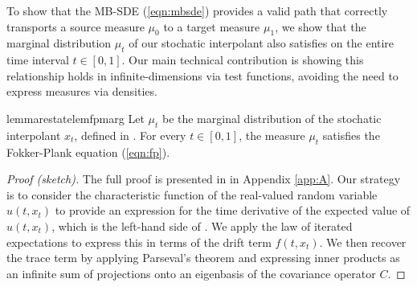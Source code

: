 To show that the MB-SDE (\ref{eqn:mbsde}) provides a valid path that correctly transports a source measure \(\mu_{0}\) to a target measure \(\mu_{1}\), we show that the marginal distribution \(\mu_{t}\) of our stochatic interpolant also satisfies  on the entire time interval \(t \in [0, 1]\). Our main technical contribution is showing this relationship holds in infinite-dimensions via test functions, avoiding the need to express measures via densities.
\begin{theorembox}
  \begin{restatable}{lemma}{restatelemfpmarg}\label{lem:fpmarg}
    Let \(\mu_{t}\) be the marginal distribution of the stochatic interpolant \(x_{t}\), defined in . For every \(t \in [0, 1]\), the measure \(\mu_{t}\) satisfies the Fokker-Plank equation (\ref{eqn:fp}).
  \end{restatable}
\end{theorembox}
\begin{proof}[Proof (sketch)]
  The full proof is presented in  in Appendix \ref{app:A}. Our strategy is to consider the characteristic function of the real-valued random variable \(u(t, x_{t})\) to provide an expression for the time derivative of the expected value of \(u(t, x_{t})\), which is the left-hand side of . We apply the law of iterated expectations to express this in terms of the drift term \(f(t, x_{t})\). We then recover the trace term by applying Parseval's theorem and expressing inner products as an infinite sum of projections onto an eigenbasis of the covariance operator \(C\).
\end{proof}

